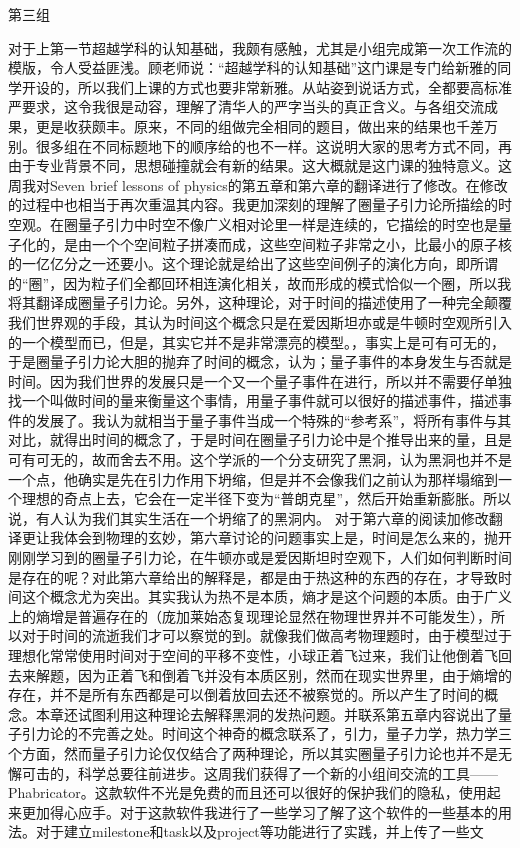 \documentclass[11pt,fleqn]{book}
\makeatletter
\numberwithin{dummy}{section}
\theoremstyle{ocrenumbox}
\theoremstyle{blacknumex}
\theoremstyle{blacknumbox}
\theoremstyle{ocrenum}
\newenvironment{remark}[1]{\par\vspace{10pt}\small %
	\begin{list}{}{
			\leftmargin=35pt %
			\rightmargin=25pt}\item\ignorespaces %
		\makebox[-2.5pt]{\begin{tikzpicture}[overlay]
			\node[draw=ocre!60,line width=1pt,circle,fill=ocre!25,font=\sffamily\bfseries,inner sep=2pt,outer sep=0pt] at (-15pt,0pt){\textcolor{ocre}{#1}};\end{tikzpicture}} %
		\advance\baselineskip -1pt}{\end{list}\vskip5pt} %
\renewcommand{\subsection}{\@startsection {subsection}{2}{\z@}
	{-3ex \@plus -0.1ex \@minus -.4ex}
	{0.5ex \@plus.2ex }
	{\normalfont\sffamily\bfseries}}
\newlength\esp
\makeatother
\begin{document}
\subsection{第三组}

\begin{remark}{刘}
	对于上第一节超越学科的认知基础，我颇有感触，尤其是小组完成第一次工作流的模版，令人受益匪浅。顾老师说：“超越学科的认知基础”这门课是专门给新雅的同学开设的，所以我们上课的方式也要非常新雅。从站姿到说话方式，全都要高标准严要求，这令我很是动容，理解了清华人的严字当头的真正含义。与各组交流成果，更是收获颇丰。原来，不同的组做完全相同的题目，做出来的结果也千差万别。很多组在不同标题地下的顺序给的也不一样。这说明大家的思考方式不同，再由于专业背景不同，思想碰撞就会有新的结果。这大概就是这门课的独特意义。这周我对Seven brief lessons of physics的第五章和第六章的翻译进行了修改。在修改的过程中也相当于再次重温其内容。我更加深刻的理解了圈量子引力论所描绘的时空观。在圈量子引力中时空不像广义相对论里一样是连续的，它描绘的时空也是量子化的，是由一个个空间粒子拼凑而成，这些空间粒子非常之小，比最小的原子核的一亿亿分之一还要小。这个理论就是给出了这些空间例子的演化方向，即所谓的“圈”，因为粒子们全都回环相连演化相关，故而形成的模式恰似一个圈，所以我将其翻译成圈量子引力论。另外，这种理论，对于时间的描述使用了一种完全颠覆我们世界观的手段，其认为时间这个概念只是在爱因斯坦亦或是牛顿时空观所引入的一个模型而已，但是，其实它并不是非常漂亮的模型。，事实上是可有可无的，于是圈量子引力论大胆的抛弃了时间的概念，认为；量子事件的本身发生与否就是时间。因为我们世界的发展只是一个又一个量子事件在进行，所以并不需要仔单独找一个叫做时间的量来衡量这个事情，用量子事件就可以很好的描述事件，描述事件的发展了。我认为就相当于量子事件当成一个特殊的“参考系”，将所有事件与其对比，就得出时间的概念了，于是时间在圈量子引力论中是个推导出来的量，且是可有可无的，故而舍去不用。这个学派的一个分支研究了黑洞，认为黑洞也并不是一个点，他确实是先在引力作用下坍缩，但是并不会像我们之前认为那样塌缩到一个理想的奇点上去，它会在一定半径下变为“普朗克星”，然后开始重新膨胀。所以说，有人认为我们其实生活在一个坍缩了的黑洞内。	对于第六章的阅读加修改翻译更让我体会到物理的玄妙，第六章讨论的问题事实上是，时间是怎么来的，抛开刚刚学习到的圈量子引力论，在牛顿亦或是爱因斯坦时空观下，人们如何判断时间是存在的呢？对此第六章给出的解释是，都是由于热这种的东西的存在，才导致时间这个概念尤为突出。其实我认为热不是本质，熵才是这个问题的本质。由于广义上的熵增是普遍存在的（庞加莱始态复现理论显然在物理世界并不可能发生），所以对于时间的流逝我们才可以察觉的到。就像我们做高考物理题时，由于模型过于理想化常常使用时间对于空间的平移不变性，小球正着飞过来，我们让他倒着飞回去来解题，因为正着飞和倒着飞并没有本质区别，然而在现实世界里，由于熵增的存在，并不是所有东西都是可以倒着放回去还不被察觉的。所以产生了时间的概念。本章还试图利用这种理论去解释黑洞的发热问题。并联系第五章内容说出了量子引力论的不完善之处。时间这个神奇的概念联系了，引力，量子力学，热力学三个方面，然而量子引力论仅仅结合了两种理论，所以其实圈量子引力论也并不是无懈可击的，科学总要往前进步。这周我们获得了一个新的小组间交流的工具——Phabricator。这款软件不光是免费的而且还可以很好的保护我们的隐私，使用起来更加得心应手。对于这款软件我进行了一些学习了解了这个软件的一些基本的用法。对于建立milestone和task以及project等功能进行了实践，并上传了一些文
\end{remark}
\end{document}
